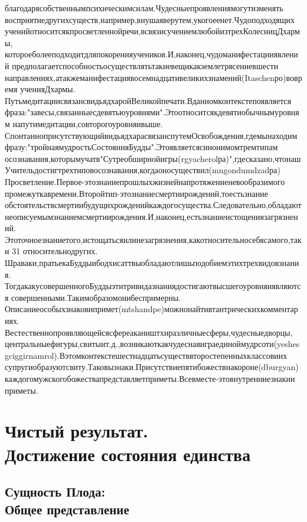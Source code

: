 благодарясобственнымпсихическимсилам.Чудесныепроявлениямогутизменять
восприятиедругихсуществ,например,внушаяверутем,укогоеенет.Чудоподходящих
ученийотноситсякпросветленнойречи,всвязисучениемлюбойизтрехКолесницДхармы,
котороеболееподходитдляпокоренияучеников.И,наконец,чудоманифестацииявлений
предполагаетспособностьосуществлятьтакиевещикакземлетрясениевшести
направлениях,атакжеманифестациявосемнадцативеликихзнамений(Itaschenро)вовремя
ученияДхармы.
ПутьмедитациисвязансвидьядхаройВеликойпечати.Вданномконтекстепоявляется
фраза:"завесы,связанныесдевятьюуровнями".Этоотноситсякдевятиобычнымуровням
напутимедитации,совторогоуровняивыше.
СпонтанноприсутствующийвидьядхарасвязанспутемОсвобождения,гдемынаходим
фразу:"тройнаямудростьСостоянияБудды".Этоявляетсясинонимомтремтипам
осознавания,которымучатв"Сутреобширнойигры(rgyacherolра)",гдесказано,чтонаш
Учительдостигтрехтиповосознавания,когдаоносуществил(mngondumdzadра)
Просветление.Первое-этознаниепрошлыхжизнейнапротяжениеневообразимого
промежуткавремени.Второйтип-этознаниесмертиирождений,тоестьзнание
обстоятельствсмертиибудущихрожденийкаждогосущества.Следовательно,обладают
неописуемымзнаниемсмертиирождения.И,наконец,естьзнаниеистощениязагрязнений.
Этоточноезнаниетого,истощатьсяилинезагрязнения,какотносительносебясамого,таки
31
относительнодругих.
Шраваки,пратьекаБуддыибодхисаттвыобладаютлишьподобиемэтихтрехвидовзнания.
ТогдакакусовершенногоБуддыэтитривидазнаниядостигаютвысшегоуровняиявляются
совершенными.Такимобразомонибеспримерны.
Описаниеособыхзнаковипримет(mtshandpe)можнонайтивтантрическихкомментариях.
Вестественнопроявляющейсясфереакаништхиразличныесферы,чудесныедворцы,
центральныефигуры,свитыит.д.,возникаюткакчудеснаяиграединоймудрсоти(yeshes
gciggirnamrol).Вэтомконтекстешестнадцатьсуществвторостепенныхклассовиих
супругиобразуютсвиту.Таковызнаки.Присутствиепятибожествнакороне(dburgyan)
каждогомужскогобожествапредставляетприметы.Всевместе-этовнутренниезнакии
приметы.

\section{Чистый результат. \\ Достижение состояния единства}

\subsection{Сущность Плода: \\ Общее представление}

